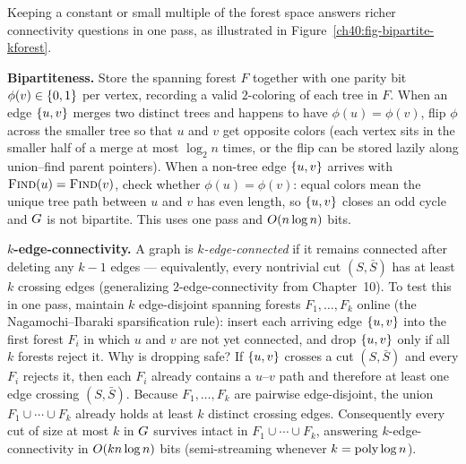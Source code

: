 Keeping a constant or small multiple of the forest space answers richer
connectivity questions in one pass, as illustrated in
Figure~\ref{ch40:fig-bipartite-kforest}.

\textbf{Bipartiteness.} Store the spanning forest $F$ together with one parity
bit $\phi(v)\in\{0,1\}$ per vertex, recording a valid $2$-coloring of each
tree in $F$. When an edge $\{u,v\}$ merges two distinct trees and happens to
have $\phi(u)=\phi(v)$, flip $\phi$ across the smaller tree so that $u$ and $v$
get opposite colors (each vertex sits in the smaller half of a merge at most
$\log_2 n$ times, or the flip can be stored lazily along union--find parent
pointers). When a non-tree edge $\{u,v\}$ arrives with
$\textsc{Find}(u)=\textsc{Find}(v)$, check whether $\phi(u)=\phi(v)$: equal
colors mean the unique tree path between $u$ and $v$ has even length, so
$\{u,v\}$ closes an odd cycle and $G$ is not bipartite. This uses one pass
and $O(n\log n)$ bits.

\textbf{$k$-edge-connectivity.} A graph is \emph{$k$-edge-connected} if it
remains connected after deleting any $k-1$ edges --- equivalently, every
nontrivial cut $(S,\bar S)$ has at least $k$ crossing edges (generalizing
$2$-edge-connectivity from Chapter~10). To test this in one pass, maintain $k$
edge-disjoint spanning forests $F_1,\dots,F_k$ online (the Nagamochi--Ibaraki
sparsification rule): insert each arriving edge $\{u,v\}$ into the first
forest $F_i$ in which $u$ and $v$ are not yet connected, and drop $\{u,v\}$
only if all $k$ forests reject it. Why is dropping safe? If $\{u,v\}$ crosses
a cut $(S,\bar S)$ and every $F_i$ rejects it, then each $F_i$ already contains
a $u$--$v$ path and therefore at least one edge crossing $(S,\bar S)$. Because
$F_1,\dots,F_k$ are pairwise edge-disjoint, the union $F_1\cup\cdots\cup F_k$
already holds at least $k$ distinct crossing edges. Consequently every cut of
size at most $k$ in $G$ survives intact in $F_1\cup\cdots\cup F_k$, answering
$k$-edge-connectivity in $O(kn\log n)$ bits (semi-streaming whenever
$k=\operatorname{poly}\log n$).

